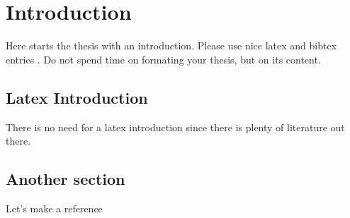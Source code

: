 \chapter{Introduction}
\label{chapter:Introduction}

Here starts the thesis with an introduction. Please use nice latex and bibtex entries \cite{latex}. Do not spend time on formating your thesis, but on its content. 
 
\section{Latex Introduction}
There is no need for a latex introduction since there is plenty of literature out there.
 
\section{Another section}
Let's make a reference \cite{Clinton09}\cite{Cook87}
